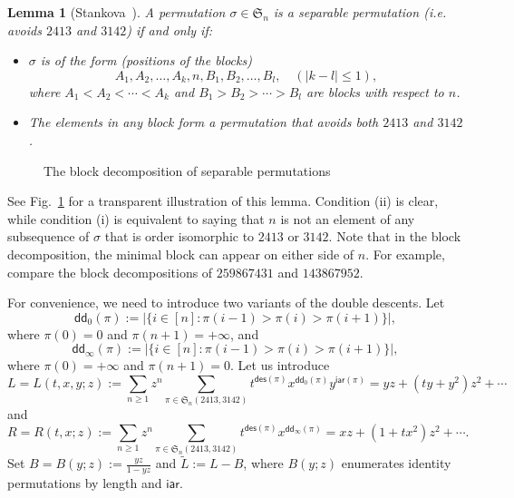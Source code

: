 \documentclass[12pt]{amsart}
\numberwithin{equation}{section}
\theoremstyle{plain}
\newtheorem{lemma}[theorem]{Lemma}
\theoremstyle{definition}
\def\des{\mathsf{des}}
\def\S{\mathfrak{S}}
\def\iar{\mathsf{iar}}
\def\dd{\mathsf{dd}}
\begin{document}
\begin{lemma}[Stankova~\cite{sk}]\label{dec:stankova}
A permutation $\sigma\in\S_n$ is a separable permutation (i.e. avoids $2413$ and $3142$) if and only if:
\begin{itemize}
\item[(i)] $\sigma$ is of the form (positions of the blocks)
$$
A_1, A_2, \ldots, A_k,n, B_1, B_2,\ldots, B_l,\quad (|k-l|\leq1),
$$
where $A_1<A_2<\cdots<A_k$ and $B_1>B_2>\cdots >B_l$ are blocks with respect to $n$.
\item[(ii)] The elements in any block form a permutation that avoids both $2413$ and $3142$.
\end{itemize}
\end{lemma}

\begin{figure}
\caption{The block decomposition of separable permutations}
\label{block:sta}
\end{figure}

See Fig.~\ref{block:sta} for a transparent illustration of this lemma. Condition (ii) is clear, while condition (i) is equivalent to saying that $n$ is not an element of any subsequence of $\sigma$ that is order isomorphic to $2413$ or $3142$. Note that in the block decomposition, the minimal block can appear on either side of $n$. For example, compare the block decompositions of $259867431$ and $143867952$.

For convenience, we need to introduce  two variants of the double descents. Let 
$$
\dd_0(\pi):=|\{i\in[n]: \pi(i-1)>\pi(i)>\pi(i+1)\}|,
$$
where $\pi(0)=0$ and $\pi(n+1)=+\infty$, and 
$$
\dd_{\infty}(\pi):=|\{i\in[n]: \pi(i-1)>\pi(i)>\pi(i+1)\}|,
$$
where $\pi(0)=+\infty$ and $\pi(n+1)=0$. Let us introduce 
$$
L=L(t,x,y;z):=\sum_{n\geq1}z^n\sum_{\pi\in\S_n(2413,3142)}t^{\des(\pi)}x^{\dd_0(\pi)}y^{\iar(\pi)}=yz+(ty+y^2)z^2+\cdots
$$
and 
$$
R=R(t,x;z):=\sum_{n\geq1}z^n\sum_{\pi\in\S_n(2413,3142)}t^{\des(\pi)}x^{\dd_{\infty}(\pi)}=xz+(1+tx^2)z^2+\cdots.
$$
Set $B=B(y;z):=\frac{yz}{1-yz}$ and $\tilde L:=L-B$, where $B(y;z)$ enumerates identity permutations by length and $\iar$. 
\end{document}
